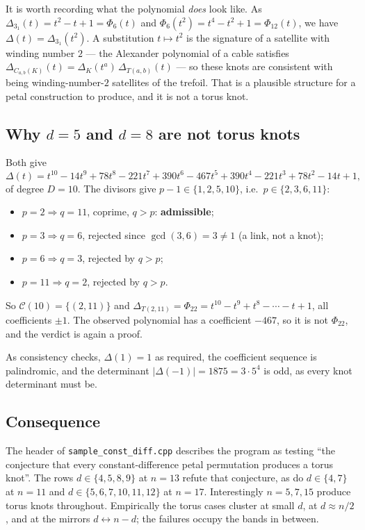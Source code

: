 \documentclass[11pt]{article}
\theoremstyle{definition}
\newcommand{\Deltaa}{\Delta}
\newcommand{\T}[2]{T(#1,#2)}
\newcommand{\Cyc}[1]{\Phi_{#1}}
\newcommand{\code}[1]{\texttt{#1}}
\begin{document}
It is worth recording what the polynomial \emph{does} look like. As
$\Deltaa_{3_{1}}(t) = t^{2}-t+1 = \Cyc{6}(t)$ and $\Cyc{6}(t^{2}) = t^{4}-t^{2}+1 = \Cyc{12}(t)$,
we have $\Deltaa(t) = \Deltaa_{3_{1}}(t^{2})$. A substitution $t\mapsto t^{2}$ is the
signature of a satellite with winding number $2$ --- the Alexander polynomial of a
cable satisfies $\Deltaa_{C_{a,b}(K)}(t) = \Deltaa_{K}(t^{a})\,\Deltaa_{\T{a}{b}}(t)$ ---
so these knots are consistent with being winding-number-$2$ satellites of the trefoil.
That is a plausible structure for a petal construction to produce, and it is not a
torus knot.

\subsection{Why \texorpdfstring{$d=5$}{d=5} and \texorpdfstring{$d=8$}{d=8} are not torus knots}

Both give
\[
\Deltaa(t) = t^{10}-14t^{9}+78t^{8}-221t^{7}+390t^{6}-467t^{5}+390t^{4}-221t^{3}+78t^{2}-14t+1,
\]
of degree $D=10$. The divisors give $p-1\in\{1,2,5,10\}$, i.e.\ $p\in\{2,3,6,11\}$:
\begin{itemize}
\item $p=2 \Rightarrow q=11$, coprime, $q>p$: \textbf{admissible};
\item $p=3 \Rightarrow q=6$, rejected since $\gcd(3,6)=3\neq1$ (a link, not a knot);
\item $p=6 \Rightarrow q=3$, rejected by $q>p$;
\item $p=11 \Rightarrow q=2$, rejected by $q>p$.
\end{itemize}
So $\mathcal{C}(10)=\{(2,11)\}$ and $\Deltaa_{\T{2}{11}} = \Cyc{22} =
t^{10}-t^{9}+t^{8}-\cdots-t+1$, all coefficients $\pm1$. The observed polynomial has a
coefficient $-467$, so it is not $\Cyc{22}$, and the verdict is again a proof.

As consistency checks, $\Deltaa(1)=1$ as required, the coefficient sequence is
palindromic, and the determinant $|\Deltaa(-1)| = 1875 = 3\cdot 5^{4}$ is odd, as every
knot determinant must be.

\subsection{Consequence}

The header of \code{sample\_const\_diff.cpp} describes the program as testing ``the
conjecture that every constant-difference petal permutation produces a torus knot''.
The rows $d\in\{4,5,8,9\}$ at $n=13$ refute that conjecture, as do $d\in\{4,7\}$ at
$n=11$ and $d\in\{5,6,7,10,11,12\}$ at $n=17$. Interestingly $n=5,7,15$ produce torus
knots throughout. Empirically the torus cases cluster at small $d$, at $d\approx n/2$,
and at the mirrors $d \leftrightarrow n-d$; the failures occupy the bands in between.
\end{document}

